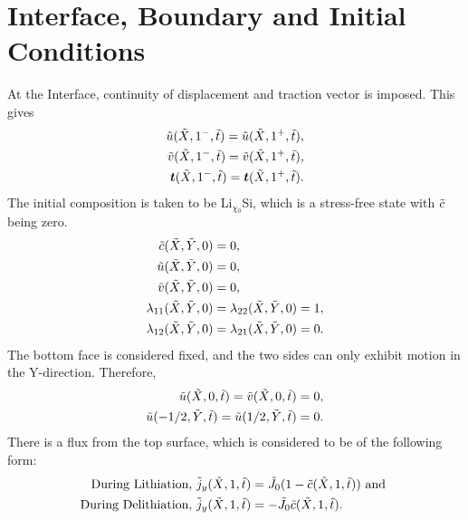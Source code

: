\section{Interface, Boundary and Initial Conditions}
At the Interface, continuity of displacement and traction vector is imposed. This gives
\begin{align}
    \tilde{u}(\tilde{X}, 1^{-}, \tilde{t}) = \tilde{u}(\tilde{X}, 1^{+}, \tilde{t}), \\
    \tilde{v}(\tilde{X}, 1^{-}, \tilde{t}) = \tilde{v}(\tilde{X}, 1^{+}, \tilde{t}), \\
    \bm{t}(\tilde{X}, 1^{-}, \tilde{t}) = \bm{t}(\tilde{X}, 1^{+}, \tilde{t}).
\end{align}
The initial composition is taken to be Li$_{\chi{_{0}}}$Si, which is a stress-free state with $\tilde{c}$ being zero.
\begin{align}
    \tilde{c}(\tilde{X}, \tilde{Y}, 0) &= 0, \\
    \tilde{u}(\tilde{X}, \tilde{Y}, 0) &= 0,\\
    \tilde{v}(\tilde{X}, \tilde{Y}, 0) &= 0, \\
    \lambda_{11}(\tilde{X}, \tilde{Y}, 0) &= \lambda_{22}(\tilde{X}, \tilde{Y}, 0) = 1, \\
    \lambda_{12}(\tilde{X}, \tilde{Y}, 0) &= \lambda_{21}(\tilde{X}, \tilde{Y}, 0) = 0.
\end{align}
The bottom face is considered fixed, and the two sides can only exhibit motion in the Y-direction. Therefore,
\begin{align}
    \tilde{u}(\tilde{X}, 0, \tilde{t}) = \tilde{v}(\tilde{X}, 0, \tilde{t}) = 0, \\
    \tilde{u}(-1/2, \tilde{Y}, \tilde{t}) =  \tilde{u}(1/2, \tilde{Y}, \tilde{t}) = 0.
\end{align}
There is a flux from the top surface, which is considered to be of the following form: 
\begin{align}
    \text{During Lithiation, }\tilde{j}_y(\tilde{X}, 1, \tilde{t}) &= \tilde{J}_0 (1 - \tilde{c}(\tilde{X}, 1, \tilde{t})) \text{ and } \\
    \text{During Delithiation, }\tilde{j}_y(\tilde{X}, 1, \tilde{t}) &= -\tilde{J}_0 \tilde{c}(\tilde{X}, 1, \tilde{t}).
\end{align} 
\vspace{4em}
